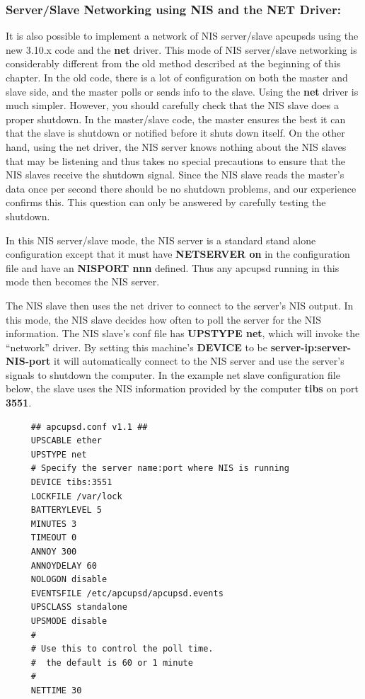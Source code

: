 {{{{{{\label{Server_002fSlave-Networking-using-NIS-and-the-NET-Driver}

\subsubsection*{Server/Slave Networking using NIS and the NET Driver:}

\label{index-NIS-networking-157}
\label{index-Net-driver-158}
It is also possible to implement a network of NIS server/slave apcupsds using
the new 3.10.x code and the {\bf net} driver. This mode of NIS server/slave
networking is considerably different from the old method described at the
beginning of this chapter. In the old code, there is a lot of configuration on
both the master and slave side, and the master polls or sends info to the
slave. Using the {\bf net} driver is much simpler. However, you should
carefully check that the NIS slave does a proper shutdown. In the master/slave
code, the master ensures the best it can that the slave is shutdown or
notified before it shuts down itself. On the other hand, using the net driver,
the NIS server knows nothing about the NIS slaves that may be listening and
thus takes no special precautions to ensure that the NIS slaves receive the
shutdown signal. Since the NIS slave reads the master's data once per second
there should be no shutdown problems, and our experience confirms this.  This
question can only be answered by carefully testing the shutdown.  

In this NIS server/slave mode, the NIS server is a standard stand alone
configuration except that it must have {\bf NETSERVER on} in the configuration
file and have an {\bf NISPORT nnn} defined. Thus any apcupsd running in this
mode then becomes the NIS server.  

The NIS slave then uses the net driver to connect to the server's NIS output.
In this mode, the NIS slave decides how often to poll the server for the NIS
information. The NIS slave's conf file has {\bf UPSTYPE net}, which will
invoke the ``network'' driver. By setting this machine's {\bf DEVICE} to be
{\bf server-ip:server-NIS-port} it will automatically connect to the NIS
server and use the server's signals to shutdown the computer.  In the example
net slave configuration file below, the slave uses the NIS information
provided by the computer {\bf tibs} on port {\bf 3551}. 

\footnotesize
\begin{verbatim}
     ## apcupsd.conf v1.1 ##
     UPSCABLE ether
     UPSTYPE net
     # Specify the server name:port where NIS is running
     DEVICE tibs:3551
     LOCKFILE /var/lock
     BATTERYLEVEL 5
     MINUTES 3
     TIMEOUT 0
     ANNOY 300
     ANNOYDELAY 60
     NOLOGON disable
     EVENTSFILE /etc/apcupsd/apcupsd.events
     UPSCLASS standalone
     UPSMODE disable
     #
     # Use this to control the poll time.
     #  the default is 60 or 1 minute
     #
     NETTIME 30
\end{verbatim}
\normalsize

}}}}}}

